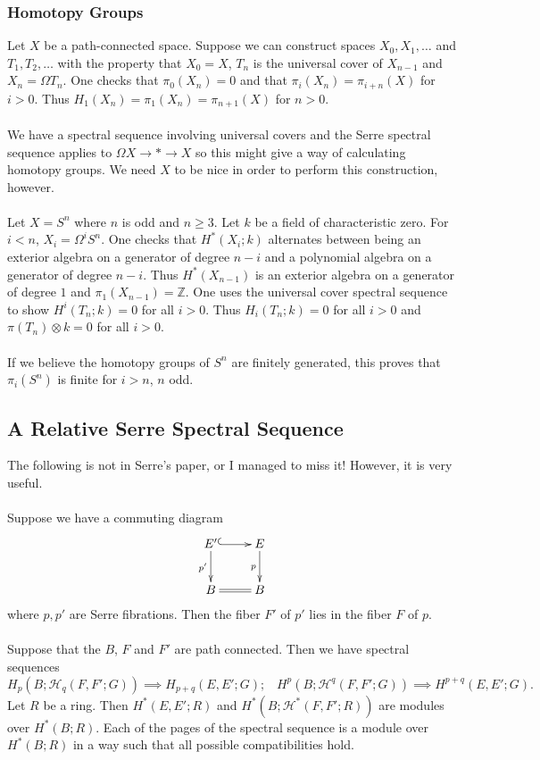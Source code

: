 \documentclass[11pt]{article}
\begin{document}
\begin{Jandr SSS notes}
	\subsubsection{Homotopy Groups}
Let $X$ be a path-connected space. Suppose we can construct spaces $X_0, X_1,\ldots$ and $T_1, T_2,\dots$ with the property that $X_0=X$, $T_n$ is the universal cover of $X_{n-1}$ and $X_n=\Omega T_n$. One checks that $\pi_0(X_n)=0$ and that $\pi_i(X_n)=\pi_{i+n}(X)$ for $i>0$. Thus $H_1(X_n)=\pi_1(X_n)=\pi_{n+1}(X)$ for $n>0$.\\
\\
We have a spectral sequence involving universal covers and the Serre spectral sequence applies to $\Omega X\to *\to X$ so this might give a way of calculating homotopy groups. We need $X$ to be nice in order to perform this construction, however.\\
\\
Let $X=S^n$ where $n$ is odd and $n\geq 3$. Let $k$ be a field of characteristic zero. For $i<n$, $X_i=\Omega^i S^n$. One checks that $H^*(X_i;k)$ alternates between being an exterior algebra on a generator of degree $n-i$ and a polynomial algebra on a generator of degree $n-i$. Thus $H^*(X_{n-1})$ is an exterior algebra on a generator of degree $1$ and $\pi_1(X_{n-1})=\mathbb{Z}$. One uses the universal cover spectral sequence to show $H^i(T_n;k)=0$ for all $i>0$. Thus $H_i(T_n;k)=0$ for all $i>0$ and $\pi(T_n)\otimes k=0$ for all $i>0$.\\
\\
If we believe the homotopy groups of $S^n$ are finitely generated, this proves that $\pi_i(S^n)$ is finite for $i>n$, $n$ odd.


\subsection{A Relative Serre Spectral Sequence}
The following is not in Serre's paper, or I managed to miss it! However, it is very useful.\\
\\
Suppose we have a commuting diagram
\[\xymatrix{E'\ar@{^{(}->}[r]\ar[d]_{p'} & E\ar[d]_p\\ B\ar@{=}[r] & B}\]
where $p,p'$ are Serre fibrations. Then the fiber $F'$ of $p'$ lies in the fiber $F$ of $p$.\\
\\
Suppose that the $B$, $F$ and $F'$ are path connected. Then we have spectral sequences
\[H_p(B;\mathscr{H}_q(F,F';G))\implies H_{p+q}(E,E';G);\hspace{10pt}
H^p(B;\mathscr{H}^q(F,F';G))\implies H^{p+q}(E,E';G).\]
Let $R$ be a ring. Then $H^*(E,E';R)$ and $H^*(B;\mathscr{H}^*(F,F';R))$ are modules over $H^*(B;R)$. Each of the pages of the spectral sequence is a module over $H^*(B;R)$ in a way such that all possible compatibilities hold.



\end{Jandr SSS notes}
\end{document}
